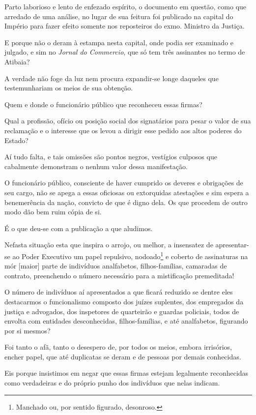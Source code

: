 Parto laborioso e lento de enfezado espírito, o documento em questão,
como que arredado de uma análise, no lugar de sua feitura foi publicado
na capital do Império para fazer efeito somente nos reposteiros do exmo.
Ministro da Justiça.

E porque não o deram à estampa nesta capital, onde podia ser examinado e
julgado, e sim no \emph{Jornal do Commercio}, que só tem três assinantes
no termo de Atibaia?

A verdade não foge da luz nem procura expandir-se longe daqueles que
testemunhariam os meios de sua obtenção.

Quem e donde o funcionário público que reconheceu essas firmas?

Qual a profissão, ofício ou posição social dos signatários para pesar o
valor de sua reclamação e o interesse que os levou a dirigir esse pedido
aos altos poderes do Estado?

Aí tudo falta, e tais omissões são pontos negros, vestígios culposos que
cabalmente demonstram o nenhum valor dessa manifestação.

O funcionário público, consciente de haver cumprido os deveres e
obrigações de seu cargo, não se apega a essas oficiosas ou extorquidas
atestações e sim espera a benemerência da nação, convicto de que é digno
dela. Os que procedem de outro modo dão bem ruim cópia de si.

É o que deu-se com a publicação a que aludimos.

Nefasta situação esta que inspira o arrojo, ou melhor, a insensatez de
apresentar-se ao Poder Executivo um papel repulsivo, nodoado\footnote{
  Manchado ou, por sentido figurado, desonroso.} e coberto de
assinaturas na mór {[}maior{]} parte de indivíduos analfabetos,
filhos-famílias, camaradas de contrato, preenchendo o número necessário
para a mistificação premeditada!

O número de indivíduos aí apresentados a que ficará reduzido se dentre
eles destacarmos o funcionalismo composto dos juízes suplentes, dos
empregados da justiça e advogados, dos inspetores de quarteirão e
guardas policiais, todos de envolta com entidades desconhecidas,
filhos-famílias, e até analfabetos, figurando por si mesmos?

Foi tanto o afã, tanto o desespero de, por todos os meios, embora
irrisórios, encher papel, que até duplicatas se deram e de pessoas por
demais conhecidas.

Eis porque insistimos em negar que essas firmas estejam legalmente
reconhecidas como verdadeiras e do próprio punho dos indivíduos que
nelas indicam.


